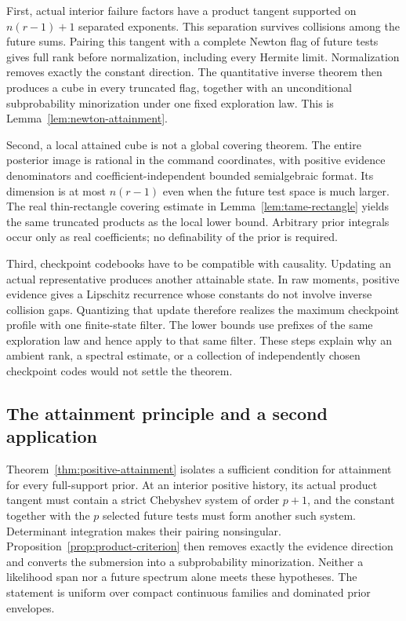 First, actual interior failure factors have a product tangent supported
on $n(r-1)+1$ separated exponents. This separation survives collisions
among the future sums. Pairing this tangent with a complete Newton flag
of future tests gives full rank before normalization, including every
Hermite limit. Normalization removes exactly the constant direction.
The quantitative inverse theorem then produces a cube in every truncated
flag, together with an unconditional subprobability minorization under
one fixed exploration law. This is Lemma~\ref{lem:newton-attainment}.

Second, a local attained cube is not a global covering theorem. The
entire posterior image is rational in the command coordinates, with
positive evidence denominators and coefficient-independent bounded
semialgebraic format. Its dimension is at most $n(r-1)$ even when the
future test space is much larger. The real thin-rectangle covering
estimate in Lemma~\ref{lem:tame-rectangle} yields the same truncated
products as the local lower bound. Arbitrary prior integrals occur only
as real coefficients; no definability of the prior is required.

Third, checkpoint codebooks have to be compatible with causality.
Updating an actual representative produces another attainable state.
In raw moments, positive evidence gives a Lipschitz recurrence whose
constants do not involve inverse collision gaps. Quantizing that update
therefore realizes the maximum checkpoint profile with one finite-state
filter. The lower bounds use prefixes of the same exploration law and
hence apply to that same filter. These steps explain why an ambient
rank, a spectral estimate, or a collection of independently chosen
checkpoint codes would not settle the theorem.

\subsection{The attainment principle and a second application}
Theorem~\ref{thm:positive-attainment} isolates a sufficient condition for
attainment for every full-support prior. At an interior positive history,
its actual product tangent must contain a strict Chebyshev system of
order $p+1$, and the constant together with the $p$ selected future tests
must form another such system. Determinant integration makes their
pairing nonsingular. Proposition~\ref{prop:product-criterion} then removes
exactly the evidence direction and converts the submersion into a
subprobability minorization. Neither a likelihood span nor a future
spectrum alone meets these hypotheses. The statement is uniform over
compact continuous families and dominated prior envelopes.

